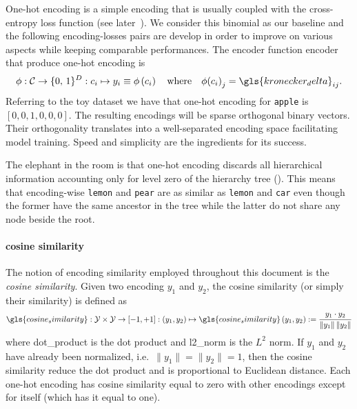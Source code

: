 One-hot encoding is a simple encoding that is usually coupled with the
cross-entropy loss function (see later~). We
consider this binomial as our baseline and the following encoding-losses pairs
are develop in order to improve on various aspects while keeping comparable
performances. The encoder function \gls{encoder} that produce one-hot encoding
is
\begin{equation}
  \phi: \mathcal{C} \to \{0, \,1\}^{D}
      : c_i \mapsto y_i \equiv \phi \left(c_i\right)
  \quad \text{where} \quad
  \phi{\left(c_i\right)}_j = \gls{kronecker_delta}_{ij}.
  \label{eq:one-hot-encoding}
\end{equation}
Referring to the toy dataset we have that one-hot encoding for \texttt{apple} is
$\left[0, 0, 1, 0, 0, 0\right]$. The resulting encodings will be sparse
orthogonal binary vectors. Their orthogonality translates into a well-separated
encoding space facilitating model training. Speed and simplicity are the
ingredients for its success.

The elephant in the room is that one-hot encoding discards all hierarchical
information accounting only for level zero of the hierarchy tree
(). This means that encoding-wise \texttt{lemon} and
\texttt{pear} are as similar as \texttt{lemon} and \texttt{car} even though the
former have the same ancestor in the tree while the latter do not share any node
beside the root.

\paragraph{cosine similarity} The notion of encoding similarity employed
throughout this document is the \emph{cosine similarity}. Given two encoding
$y_1$ and $y_2$, the cosine similarity (or simply their similarity) is defined
as
\begin{equation}
  \gls{cosine_similarity}: \mathcal{Y} \times \mathcal{Y} \to \left[-1, +1\right]
  : (y_1, y_2) \mapsto \gls{cosine_similarity} \,(y_1, y_2) :=
  \frac{y_1 \cdot y_2}{\|y_1\| \, \|y_2\|}
  \label{eq:cosine-simiarity}
\end{equation}
where \gls{dot_product} is the dot product and \gls{l2_norm} is the $L^2$ norm.
If $y_1$ and $y_2$ have already been normalized, i.e.\ $\|y_1\| = \|y_2\| = 1$,
then the cosine similarity reduce the dot product and is proportional to
Euclidean distance. Each one-hot encoding has cosine similarity equal to zero
with other encodings except for itself (which has it equal to one).


